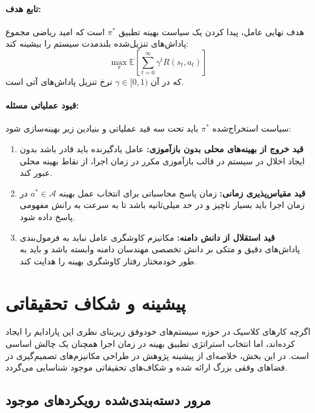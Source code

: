 \documentclass[oneside,openany,phd]{TMU-Thesis}
\begin{document}
\paragraph{تابع هدف:}
هدف نهایی عامل، پیدا کردن یک سیاست بهینه تطبیق $\pi^*$ است که امید ریاضی مجموع پاداش‌های تنزیل‌شده بلندمدت سیستم را بیشینه کند:
\begin{equation}
\max_{\pi} \mathbb{E}\left[ \sum_{t=0}^{\infty} \gamma^t R(s_t, a_t) \right]
\end{equation}
که در آن $\gamma \in [0, 1)$ نرخ تنزیل پاداش‌های آتی است.

\paragraph{قیود عملیاتی مسئله:}
سیاست استخراج‌شده $\pi^*$ باید تحت سه قید عملیاتی و بنیادین زیر بهینه‌سازی شود:
\begin{enumerate}
    \item \textbf{قید خروج از بهینه‌های محلی بدون بازآموزی:} عامل یادگیرنده باید قادر باشد بدون ایجاد اخلال در سیستم در قالب بازآموزی مکرر در زمان اجرا، از نقاط بهینه محلی عبور کند.
    \item \textbf{قید مقیاس‌پذیری زمانی:} زمان پاسخ محاسباتی برای انتخاب عمل بهینه $a^* \in \mathcal{A}$ در زمان اجرا باید بسیار ناچیز و در حد میلی‌ثانیه باشد تا به سرعت به رانش مفهومی پاسخ داده شود.
    \item \textbf{قید استقلال از دانش دامنه:} مکانیزم کاوشگری عامل نباید به فرمول‌بندی پاداش‌های دقیق و متکی بر دانش تخصصی مهندسان دامنه وابسته باشد و باید به طور خودمختار رفتار کاوشگری بهینه را هدایت کند.
\end{enumerate}

\section*{پیشینه و شکاف تحقیقاتی}

اگرچه کارهای کلاسیک در حوزه سیستم‌های خودوفق زیربنای نظری این پارادایم را ایجاد کرده‌اند، اما انتخاب استراتژی تطبیق بهینه در زمان اجرا همچنان یک چالش اساسی است. در این بخش، خلاصه‌ای از پیشینه پژوهش در طراحی مکانیزم‌های تصمیم‌گیری در فضاهای وفقی بزرگ ارائه شده و شکاف‌های تحقیقاتی موجود شناسایی می‌گردد.

\subsection*{مرور دسته‌بندی‌شده رویکردهای موجود}
\end{document}
